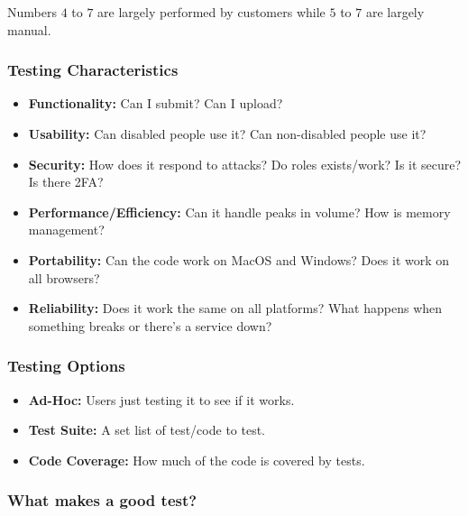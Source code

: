 \begin{note}
    Numbers \(4\) to \(7\) are largely performed by customers while \(5\) to \(7\) are largely manual.
\end{note}

\subsubsection{Testing Characteristics}\label{ssub:testing_characteristics}

\begin{itemize}
    \item \textbf{Functionality:} Can I submit? Can I upload?
    \item \textbf{Usability:} Can disabled people use it? Can non-disabled people use it?
    \item \textbf{Security:} How does it respond to attacks? Do roles exists/work? Is it secure? Is there 2FA?
    \item \textbf{Performance/Efficiency:} Can it handle peaks in volume? How is memory management?
    \item \textbf{Portability:} Can the code work on MacOS and Windows? Does it work on all browsers?
    \item \textbf{Reliability:} Does it work the same on all platforms? What happens when something breaks or there's a service down?
\end{itemize}

\subsubsection{Testing Options}\label{ssub:testing_options}

\begin{itemize}
    \item \textbf{Ad-Hoc:} Users just testing it to see if it works.
    \item \textbf{Test Suite:} A set list of test/code to test.
    \item \textbf{Code Coverage:} How much of the code is covered by tests.
\end{itemize}

\subsubsection{What makes a good test?}\label{ssub:what_makes_a_good_test_}

